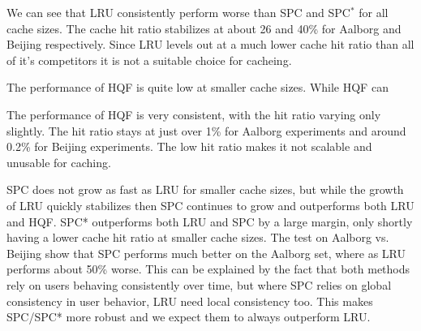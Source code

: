 {\color{red}
We can see that LRU consistently perform worse than SPC and SPC$^*$ for all cache sizes. The cache hit ratio stabilizes at about 26 and 40\% for Aalborg and Beijing respectively. Since LRU levels out at a much lower cache hit ratio than all of it's competitors it is not a suitable choice for \spath cacheing.


The performance of HQF is quite low at smaller cache sizes. While HQF can 

The performance of HQF is very consistent, with the hit ratio varying only slightly. The hit ratio stays at just over 1\% for Aalborg experiments and around 0.2\% for Beijing experiments. The low hit ratio makes it not scalable and unusable for \spath caching.
}

SPC does not grow as fast as LRU for smaller cache sizes, but while the growth of LRU quickly stabilizes then SPC continues to grow and outperforms both LRU and HQF.
SPC* outperforms both LRU and SPC by a large margin, only shortly having a lower cache hit ratio at smaller cache sizes. The test on Aalborg vs. Beijing  show that SPC performs much better on the Aalborg set, where as LRU performs about 50\% worse. This can be explained by the fact that both methods rely on users behaving consistently over time, but where SPC relies on global consistency in user behavior, LRU need local consistency too. This makes SPC/SPC* more robust and we expect them to always outperform LRU.



